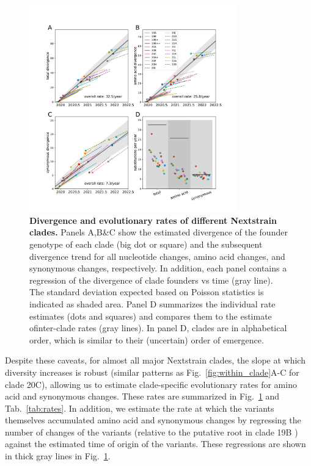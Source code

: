 \documentclass[aps,rmp, twocolumn]{revtex4}
\begin{document}
\begin{figure}
    \includegraphics[width=0.8\textwidth]{figures/rate_summary.pdf}
    \caption[]{{\bf Divergence and evolutionary rates of different Nextstrain clades.} Panels A,B\&C show the estimated divergence of the founder genotype of each clade (big dot or square) and the subsequent divergence trend for all nucleotide changes, amino acid changes, and synonymous changes, respectively.
    In addition, each panel contains a regression of the divergence of clade founders vs time (gray line).
    The standard deviation expected based on Poisson statistics is indicated as shaded area.
    Panel D summarizes the individual rate estimates (dots and squares) and compares them to the estimate ofinter-clade rates (gray lines).
    In panel D, clades are in alphabetical order, which is similar to their (uncertain) order of emergence.
    \label{fig:rate_summary} }
\end{figure}

Despite these caveats, for almost all major Nextstrain clades, the slope at which diversity increases is robust (similar patterns as Fig.~\ref{fig:within_clade}A-C for clade 20C), allowing us to estimate clade-specific evolutionary rates for amino acid and synonymous changes.
These rates are summarized in Fig.~\ref{fig:rate_summary} and Tab.~\ref{tab:rates}.
In addition, we estimate the rate at which the variants themselves accumulated amino acid and synonymous changes by regressing the number of changes of the variants (relative to the putative root in clade 19B \citep{caraballo-ortiz_tophap_2022}) against the estimated time of origin of the variants.
These regressions are shown in thick gray lines in Fig.~\ref{fig:rate_summary}.
\end{document}
